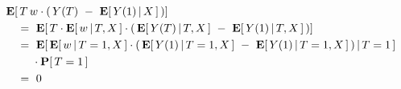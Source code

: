 \begin{align*}
  &\E[
  \,
    T\, w
    \cdot
    (
    \,
      Y(T)\  -\  \E[\,Y(1)\,|\,X\,]
      \,
    )
  ]
  \\
  &
  \quad 
  =
  \ 
  \E
  [
  \,
    T
    \cdot
    \E[
    \,
    w
    \,
    |
    \,
    T,X
    \,
    ]
    \cdot
    (
    \,
      \E[\,Y(T)\,|\,T,X\,]
      \ 
      -
      \ 
      \E[\,Y(1)\,|\,T,X\,]
      \,
    )
  ]
  \\
  &
  \quad 
  =
  \ 
  \E
  [
  \,
    \E[
    \,
    w
    \,
    |
    \,
    T=1,X
    \,
    ]
    \cdot
    (
    \,
      \E[\,Y(1)\,|\,T=1,X\,]
      \ 
      -
      \ 
      \E[\,Y(1)\,|\,T=1,X\,]
      \,
    )
    \,
    |\,T=1
    \,
  ]
  \\
  &\qquad
  \ 
  \cdot
  \P[\,T=1\,]
  \\
  &\quad
  =\ 0
\end{align*}
